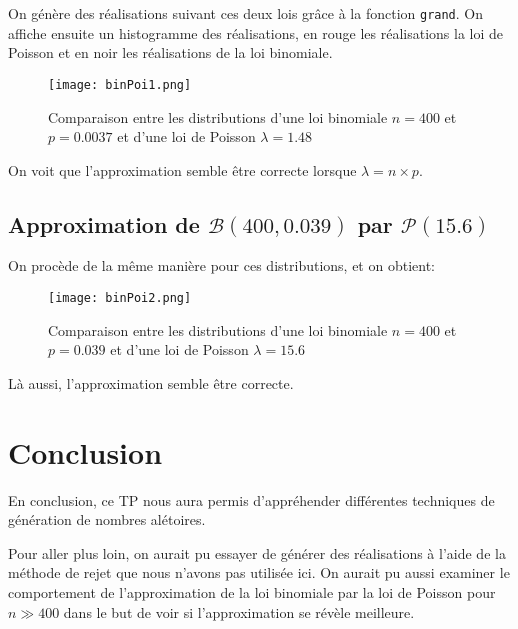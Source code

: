 \documentclass{article}
\begin{document}
\begin{multicols}{2}
On génère des réalisations suivant ces deux lois grâce à la fonction
\texttt{grand}. On affiche ensuite un histogramme des réalisations, en rouge les
réalisations la loi de Poisson et en noir les réalisations de la loi binomiale.

\begin{figure}[H]
    \begin{center}
        \texttt{[image: binPoi1.png]}
        \centering
        \captionsetup{justification=centering}
        \caption{\label{fig:binPoi1}Comparaison entre les distributions d'une loi binomiale $n = 400$ et $p = 0.0037$ et d'une loi de Poisson $\lambda = 1.48$}
    \end{center}
\end{figure}

On voit que l'approximation semble être correcte lorsque $\lambda = n \times p$.

\subsection{Approximation de $\mathcal{B}(400, 0.039)$ par $\mathcal{P}(15.6)$}\label{subsec:ex31}

On procède de la même manière pour ces distributions, et on obtient:

\begin{figure}[H]
    \begin{center}
        \texttt{[image: binPoi2.png]}
        \centering
        \captionsetup{justification=centering}
        \caption{\label{fig:binPoi2}Comparaison entre les distributions d'une loi binomiale $n = 400$ et $p = 0.039$ et d'une loi de Poisson $\lambda = 15.6$}
    \end{center}
\end{figure}

Là aussi, l'approximation semble être correcte.


\section{Conclusion}\label{sec:conclu}

En conclusion, ce TP nous aura permis d'appréhender différentes techniques de
génération de nombres alétoires.

Pour aller plus loin, on aurait pu essayer de générer des réalisations à l'aide
de la méthode de rejet que nous n'avons pas utilisée ici.
On aurait pu aussi examiner le comportement de l'approximation de la loi
binomiale par la loi de Poisson pour $n \gg 400$ dans le but de voir si
l'approximation se révèle meilleure.


\end{multicols}
\end{document}

